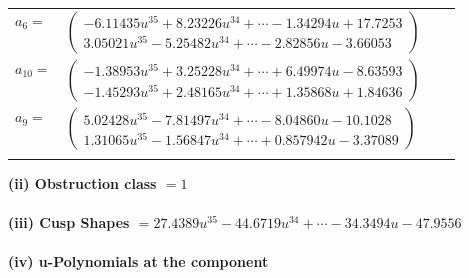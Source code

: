 \documentclass[1p]{elsarticle_modified}
\theoremstyle{definition}
\begin{document}
\begin{tabular}{m{7pt} m{180pt} m{7pt} m{180pt} }
\flushright $a_{6}=$&$\begin{pmatrix}-6.11435 u^{35}+8.23226 u^{34}+\cdots-1.34294 u+17.7253\\3.05021 u^{35}-5.25482 u^{34}+\cdots-2.82856 u-3.66053\end{pmatrix}$ \\
\flushright $a_{10}=$&$\begin{pmatrix}-1.38953 u^{35}+3.25228 u^{34}+\cdots+6.49974 u-8.63593\\-1.45293 u^{35}+2.48165 u^{34}+\cdots+1.35868 u+1.84636\end{pmatrix}$ \\
\flushright $a_{9}=$&$\begin{pmatrix}5.02428 u^{35}-7.81497 u^{34}+\cdots-8.04860 u-10.1028\\1.31065 u^{35}-1.56847 u^{34}+\cdots+0.857942 u-3.37089\end{pmatrix}$\\&\end{tabular}
\flushleft \textbf{(ii) Obstruction class $= 1$}\\~\\
\flushleft \textbf{(iii) Cusp Shapes $= 27.4389 u^{35}-44.6719 u^{34}+\cdots-34.3494 u-47.9556$}\\~\\
\newpage\renewcommand{\arraystretch}{1}
\flushleft \textbf{(iv) u-Polynomials at the component}\newline \\
\end{document}
